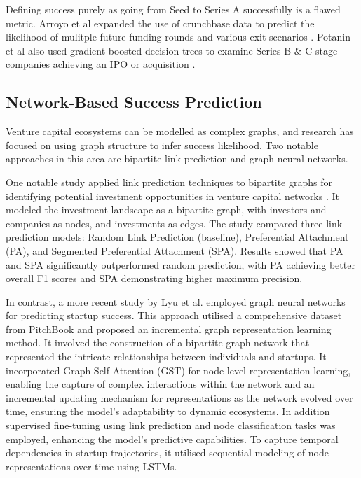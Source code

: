 \documentclass[a4paper, oneside]{discothesis}
\begin{document}
Defining success purely as going from Seed to Series A successfully is a flawed metric. Arroyo et al expanded the use of crunchbase data to predict the likelihood of mulitple future funding rounds and various exit scenarios \cite{corea}. Potanin et al also used gradient boosted decision trees to examine Series B & C stage companies achieving an IPO or acquisition \cite{potanin2023startupsuccesspredictionvc}. 

\subsection{Network-Based Success Prediction}

Venture capital ecosystems can be modelled as complex graphs, and research has focused on using graph structure to infer success likelihood. Two notable approaches in this area are bipartite link prediction and graph neural networks.

One notable study applied link prediction techniques to bipartite graphs for identifying potential investment opportunities in venture capital networks \cite{predictVCbipartite}. It modeled the investment landscape as a bipartite graph, with investors and companies as nodes, and investments as edges. The study compared three link prediction models: Random Link Prediction (baseline), Preferential Attachment (PA), and Segmented Preferential Attachment (SPA). Results showed that PA and SPA significantly outperformed random prediction, with PA achieving better overall F1 scores and SPA demonstrating higher maximum precision.

In contrast, a more recent study by Lyu et al. \cite{lyu2021graph} employed graph neural networks for predicting startup success. This approach utilised a comprehensive dataset from PitchBook and proposed an incremental graph representation learning method. It involved the construction of a bipartite graph network that represented the intricate relationships between individuals and startups. It incorporated Graph Self-Attention (GST) for node-level representation learning, enabling the capture of complex interactions within the network and an incremental updating mechanism for representations as the network evolved over time, ensuring the model's adaptability to dynamic ecosystems. In addition supervised fine-tuning using link prediction and node classification tasks was employed, enhancing the model's predictive capabilities. To capture temporal dependencies in startup trajectories, it utilised sequential modeling of node representations over time using LSTMs.
\end{document}
